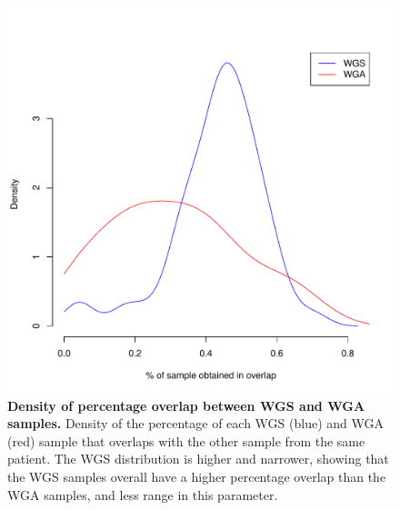 \documentclass[11pt]{article} %
\begin{document}
\begin{figure}
\centerline{
\includegraphics[width=5in]{unfiltered_overlap_WGS_WGA_together_densities.pdf} }
\caption{\textbf{Density of percentage overlap between WGS and WGA samples.} Density of the percentage of each WGS (blue) and WGA (red) sample that overlaps with the other sample from the same patient. The WGS distribution is higher and narrower, showing that the WGS samples overall have a higher percentage overlap than the WGA samples, and less range in this parameter. }
\end{figure}
\end{document}
